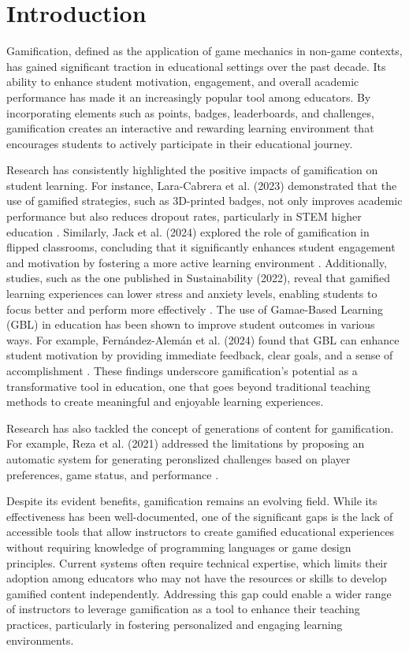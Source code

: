 \chapter{Introduction}
\label{chap:intro}
Gamification, defined as the application of game mechanics in non-game contexts, has gained significant traction in educational settings over the past decade. Its ability to enhance student motivation, engagement, and overall academic performance has made it an increasingly popular tool among educators. By incorporating elements such as points, badges, leaderboards, and challenges, gamification creates an interactive and rewarding learning environment that encourages students to actively participate in their educational journey.

Research has consistently highlighted the positive impacts of gamification on student learning. For instance, Lara-Cabrera et al. (2023)  demonstrated that the use of gamified strategies, such as 3D-printed badges, not only improves academic performance but also reduces dropout rates, particularly in STEM higher education \cite{lara2023badges}. Similarly, Jack et al. (2024) explored the role of gamification in flipped classrooms, concluding that it significantly enhances student engagement and motivation by fostering a more active learning environment \cite{jack2024gamification}. Additionally, studies, such as the one published in Sustainability (2022), reveal that gamified learning experiences can lower stress and anxiety levels, enabling students to focus better and perform more effectively \cite{sustainability2022gamification}. The use of Gamae-Based Learning (GBL) in education has been shown to improve student outcomes in various ways. For example, Fernández-Alemán et al. (2024) found that GBL can enhance student motivation by providing immediate feedback, clear goals, and a sense of accomplishment \cite{fernando2024}. These findings underscore gamification's potential as a transformative tool in education, one that goes beyond traditional teaching methods to create meaningful and enjoyable learning experiences.


Research has also tackled the concept of generations of content for gamification. For example, Reza et al. (2021) addressed the limitations by proposing an automatic system for generating peronslized challenges based on player preferences, game status, and performance \cite{khoshkangini2021}.

Despite its evident benefits, gamification remains an evolving field. While its effectiveness has been well-documented, one of the significant gaps is the lack of accessible tools that allow instructors to create gamified educational experiences without requiring knowledge of programming languages or game design principles. Current systems often require technical expertise, which limits their adoption among educators who may not have the resources or skills to develop gamified content independently. Addressing this gap could enable a wider range of instructors to leverage gamification as a tool to enhance their teaching practices, particularly in fostering personalized and engaging learning environments.

